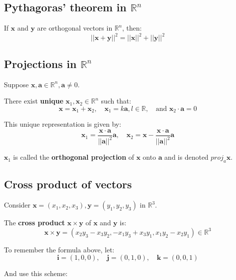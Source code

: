 \documentclass[11pt]{article}
\begin{document}
\subsection{Pythagoras' theorem in \(\mathbb{R}^n\)}
\label{sec:org38f7552}
If \(\boldsymbol{x}\) and \(\boldsymbol{y}\) are orthogonal vectors in \(\mathbb{R}^n\), then:
\[|| \boldsymbol{x} + \boldsymbol{y} ||^2 = || \boldsymbol{x} ||^2 + || \boldsymbol{y} ||^2\]
\subsection{Projections in \(\mathbb{R}^n\)}
\label{sec:org4732599}
Suppose \(\boldsymbol{x}, \boldsymbol{a} \in \mathbb{R}^n, \boldsymbol{a} \ne 0\).


There exist \textbf{unique} \(\boldsymbol{x}_1, \boldsymbol{x}_2 \in \mathbb{R}^n\) such that:
\[\boldsymbol{x} = \boldsymbol{x}_1 + \boldsymbol{x}_2, \quad \boldsymbol{x}_1 = k \boldsymbol{a}, l \in \mathbb{R}, \quad \text{and } \boldsymbol{x}_2 \cdot \boldsymbol{a} = 0\]

This unique representation is given by:
\[\boldsymbol{x}_1 = \frac{\boldsymbol{x} \cdot \boldsymbol{a}}{|| \boldsymbol{a} ||^2} \boldsymbol{a}, \quad \boldsymbol{x}_2 = \boldsymbol{x} - \frac{\boldsymbol{x} \cdot \boldsymbol{a}}{|| \boldsymbol{a} ||^2} \boldsymbol{a}\]

\(\boldsymbol{x}_1\) is called the \textbf{orthogonal projection} of \(\boldsymbol{x}\) onto \(\boldsymbol{a}\) and is denoted \(proj_a \boldsymbol{x}\).
\subsection{Cross product of vectors}
\label{sec:orgb3d46fd}
Consider \(\boldsymbol{x} = (x_1, x_2, x_3), \boldsymbol{y} = (y_1, y_2, y_3)\) in \(\mathbb{R}^3\).


The \textbf{cross product} \(\boldsymbol{x} \times \boldsymbol{y}\) of \(\boldsymbol{x}\) and \(\boldsymbol{y}\) is:
\[\boldsymbol{x} \times \boldsymbol{y} = (x_2 y_3 - x_3 y_2, -x_1 y_3 + x_3 y_1, x_1 y_2 - x_2 y_1) \in \mathbb{R}^3\]

To remember the formula above, let:
\[\boldsymbol{i} = (1, 0, 0), \quad \boldsymbol{j} = (0, 1, 0), \quad \boldsymbol{k} = (0, 0, 1)\]

And use this scheme:
\end{document}
